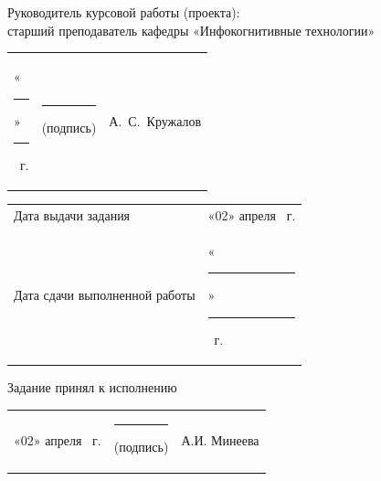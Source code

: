 \documentclass[14pt, a4paper]{extarticle}
\begin{document}

Руководитель курсовой работы (проекта): \\ старший преподаватель кафедры
«Инфокогнитивные технологии»

{
\renewcommand{\arraystretch}{2}
\noindent
\begin{tabularx}{\textwidth}{@{} P{0.45\textwidth} P{0.3\textwidth} P{0.25\textwidth} @{}}

    «\rule{0.8cm}{0.4pt}» \quad \rule{2cm}{0.4pt} ~г. &
    \centering \rule{3.5cm}{0.4pt} \par \footnotesize (подпись) &
    \hfill А.~С.~Кружалов                                         \\
\end{tabularx}

\begin{tabularx}{\textwidth}{@{} P{0.45\textwidth} P{0.55\textwidth} @{}}
    Дата выдачи задания           &
    \hfill «02» \quad апреля  ~г. \\

    Дата сдачи выполненной работы &
    \hfill «\rule{0.8cm}{0.4pt}» \quad \rule{2cm}{0.4pt} ~г. \\
\end{tabularx}
}

Задание принял к исполнению

{
\renewcommand{\arraystretch}{1.5}
\begin{tabularx}{\textwidth}{@{} P{0.45\textwidth} P{0.3\textwidth} P{0.25\textwidth} @{}}

    «02» \quad апреля  ~г. &
    \centering \rule{3.5cm}{0.4pt} \par \footnotesize(подпись) &
    \hfill А.И. Минеева                                          \\
\end{tabularx}
}
\end{document}
